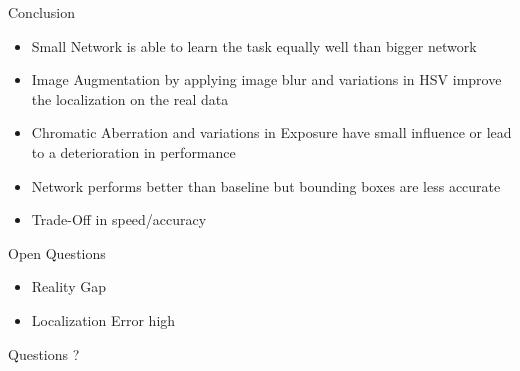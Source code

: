 \documentclass{beamer}
\begin{document}
\begin{darkframes}
\begin{frame}{Conclusion}
    \begin{itemize}
    	\item Small Network is able to learn the task equally well than bigger network
    	\item Image Augmentation by applying image blur and variations in HSV improve the localization on the real data
    	\item Chromatic Aberration and variations in Exposure have small influence or lead to a deterioration in performance
    	\item Network performs better than baseline but bounding boxes are less accurate
    	\item Trade-Off in speed/accuracy
    \end{itemize}
    \end{frame}

       \begin{frame}{Open Questions}
\begin{itemize}
	\item Reality Gap
	\item Localization Error high
  \end{itemize} 
\end{frame}
    \begin{frame}{Questions}
    \centering
\huge ?
    	\end{frame}
    
    
  \end{darkframes}
\end{document}

